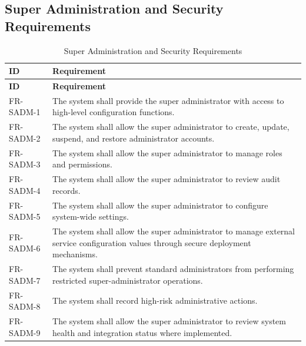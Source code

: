 \subsection{Super Administration and Security Requirements}
\begin{longtable}{@{}p{2.4cm}p{11cm}@{}}
\caption{Super Administration and Security Requirements} \label{tab:fr-sadm} \\
\toprule \textbf{ID} & \textbf{Requirement} \\ \midrule
\endfirsthead
\toprule \textbf{ID} & \textbf{Requirement} \\ \midrule
\endhead
FR-SADM-1 & The system shall provide the super administrator with access to high-level configuration functions. \\
FR-SADM-2 & The system shall allow the super administrator to create, update, suspend, and restore administrator accounts. \\
FR-SADM-3 & The system shall allow the super administrator to manage roles and permissions. \\
FR-SADM-4 & The system shall allow the super administrator to review audit records. \\
FR-SADM-5 & The system shall allow the super administrator to configure system-wide settings. \\
FR-SADM-6 & The system shall allow the super administrator to manage external service configuration values through secure deployment mechanisms. \\
FR-SADM-7 & The system shall prevent standard administrators from performing restricted super-administrator operations. \\
FR-SADM-8 & The system shall record high-risk administrative actions. \\
FR-SADM-9 & The system shall allow the super administrator to review system health and integration status where implemented. \\
\bottomrule
\end{longtable}

